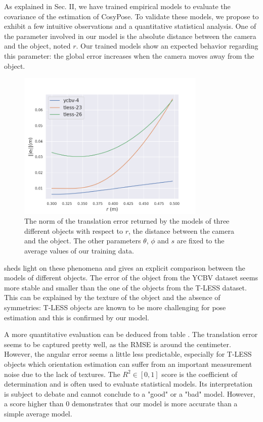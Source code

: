 As explained in Sec. II, we have trained empirical models to evaluate the covariance of the estimation of CosyPose. 
To validate these models, we propose to exhibit a few intuitive observations and a quantitative statistical analysis. 
One of the parameter involved in our model is the absolute distance between the camera and the object, noted $r$. 
Our trained models show an expected behavior regarding this parameter: the global error increases when the camera moves away from the object. 
%
\begin{figure}[h]
  \centering 
  \includegraphics[width=0.8\textwidth]{figures/cosyslam/empirical_err.png}
  \caption{The norm of the translation error returned by the models of three different objects with respect to $r$, the distance between the camera and the object. 
            The other parameters $\theta$, $\phi$ and $s$ are fixed to the average values of our training data. }
  \label{fig:empirical_err}
\end{figure}

 sheds light on these phenomena and gives an explicit comparison between the models of different objects. 
The error of the object from the YCBV dataset seems more stable and smaller than the one of the objects from the T-LESS dataset. 
This can be explained by the texture of the object and the absence of symmetries: T-LESS objects are known to be more challenging 
for pose estimation and this is confirmed by our model.

A more quantitative evaluation can be deduced from table . The translation error seems to be captured pretty well,
 as the RMSE is around the centimeter. However, the angular error seems a little less predictable, especially for T-LESS objects which orientation 
 estimation can suffer from an important measurement noise due to the lack of textures. The $R^2\in[0,1]$ score is the coefficient of determination 
 and is often used to evaluate statistical models. Its interpretation is subject to debate and cannot conclude to a "good" or a "bad" model. 
 However, a score higher than 0 demonstrates that our model is more accurate than a simple average model.

